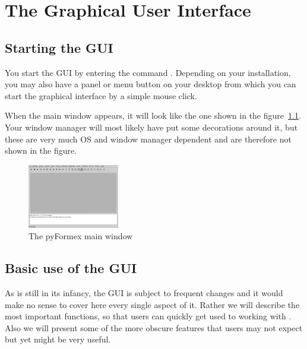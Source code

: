 
\chapter{The Graphical User Interface}
\label{cha:gui}

\section{Starting the GUI}
You start the \pyf GUI by entering the command . Depending on your installation, you may also have a panel or menu button on your desktop from which you can start the \pyf graphical interface by a simple mouse click. 

When the main window appears, it will look like the one shown in the figure~\ref{fig:gui}. Your window manager will most likely have put some decorations around it, but these are very much OS and window manager dependent and are therefore not shown in the figure.

\begin{figure}[h]
  \centering
  \begin{makeimage}
  \end{makeimage}
  \begin{latexonly}
    \includegraphics[width=4cm]{images/gui}
  \end{latexonly}
  \begin{htmlonly}
  \end{htmlonly}  
  \caption{The pyFormex main window}
  \label{fig:gui}
\end{figure}

\section{Basic use of the GUI}

As \pyf is still in its infancy, the GUI is subject to frequent changes and it would make no sense to cover here every single aspect of it. Rather we will describe the most important functions, so that users can quickly get used to working with \pyf. Also we will present some of the more obscure features that users may not expect but yet might be very useful. 

